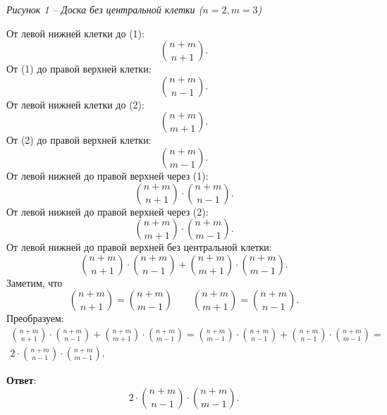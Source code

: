 \documentclass{article}
\begin{document}
\begin{enumerate}
\begin{itemize}
\begin{center}
        \textit{Рисунок 1 -- Доска без центральной клетки ($n = 2, m = 3$)}
      \end{center}
      От левой нижней клетки до (1):
      \begin{equation}
        \binom{n + m}{n + 1}.
      \end{equation}
      От (1) до правой верхней клетки:
      \begin{equation}
        \binom{n + m}{n - 1}.
      \end{equation}
      От левой нижней клетки до (2):
      \begin{equation}
        \binom{n + m}{m + 1}.
      \end{equation}
      От (2) до правой верхней клетки:
      \begin{equation}
        \binom{n + m}{m - 1}.
      \end{equation}
      От левой нижней до правой верхней через (1):
      \begin{equation}
        \binom{n + m}{n + 1} \cdot \binom{n + m}{n - 1}.
      \end{equation}
      От левой нижней до правой верхней через (2):
      \begin{equation}
        \binom{n + m}{m + 1} \cdot \binom{n + m}{m - 1}.
      \end{equation}
      От левой нижней до правой верхней без центральной клетки:
      \begin{equation}
        \binom{n + m}{n + 1} \cdot \binom{n + m}{n - 1} + \binom{n + m}{m + 1} \cdot \binom{n + m}{m - 1}.
      \end{equation}
      Заметим, что
      \begin{equation}
        \binom{n + m}{n + 1} = \binom{n + m}{m - 1} \qquad \binom{n + m}{m + 1} = \binom{n + m}{n - 1}.
      \end{equation}
      Преобразуем:
      \begin{eqnarray}
        \binom{n + m}{n + 1} \cdot \binom{n + m}{n - 1} + \binom{n + m}{m + 1} \cdot \binom{n + m}{m - 1} = \binom{n + m}{m - 1} \cdot \binom{n + m}{n - 1} + \binom{n + m}{n - 1} \cdot \binom{n + m}{m - 1} = \\
        2 \cdot \binom{n + m}{n - 1} \cdot \binom{n + m}{m - 1}.
      \end{eqnarray}

      \textbf{Ответ}:
      $$2 \cdot \binom{n + m}{n - 1} \cdot \binom{n + m}{m - 1}.$$

    \end{itemize}

      
  \end{enumerate}
\end{document}
